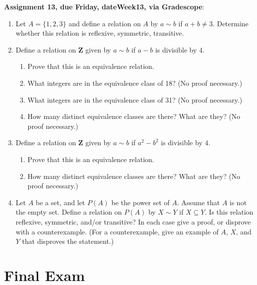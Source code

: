 \documentclass[12pt]{article}
\begin{document}
\noindent \textbf{Assignment 13, due Friday, \csname dateWeek13\endcsname, via Gradescope}:
\begin{enumerate}
\item Let $A = \{1,2,3\}$ and define a relation on $A$ by $a \sim b$ if $a + b \neq 3$. Determine whether this relation is reflexive, symmetric, transitive.
\item Define a relation on $\mathbf{Z}$ given by $a \sim b$ if $a-b$ is divisible by $4$.
 \begin{enumerate}
 \item Prove that this is an equivalence relation.
 \item What integers are in the equivalence class of 18? (No proof necessary.)
 \item What integers are in the equivalence class of 31? (No proof necessary.) 
 \item How many distinct equivalence classes are there? What are they? (No proof necessary.)
 \end{enumerate}
\item Define a relation on $\mathbf{Z}$ given by $a \sim b$ if $a^2-b^2$ is divisible by $4$.
 \begin{enumerate}
 \item Prove that this is an equivalence relation.
 \item How many distinct equivalence classes are there? What are they? (No proof necessary.)
 \end{enumerate} 
\item Let $A$ be a set, and let $P(A)$ be the power set of $A$. Assume that $A$ is not the empty set. Define a relation on $P(A)$ by $X \sim Y$ if $X \subseteq Y$. Is this relation reflexive, symmetric, and/or transitive? In each case give a proof, or disprove with a counterexample. (For a counterexample, give an example of $A$, $X$, and $Y$ that disproves the statement.)
\end{enumerate}





\newpage
\section[Final Exam]{Final Exam}
\end{document}
